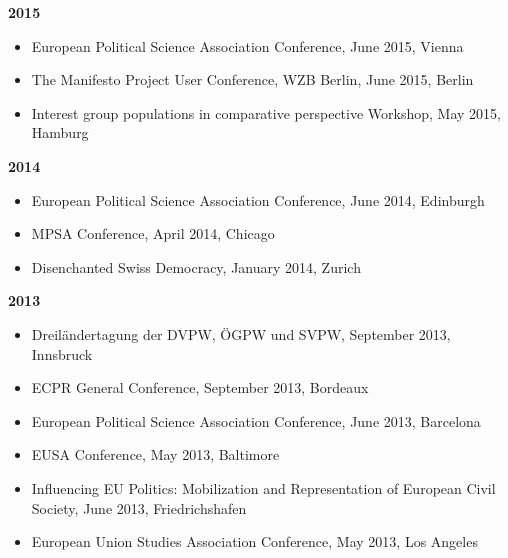 \vspace{\baselineskip}

\textbf{2015}
\begin{itemize}[topsep=0pt, noitemsep, leftmargin=3]
	\item European Political Science Association Conference, June 2015, Vienna
	\item The Manifesto Project User Conference, WZB Berlin, June 2015, Berlin
	\item Interest group populations in comparative perspective Workshop, May 2015, Hamburg
\end{itemize}

\vspace{\baselineskip}

\textbf{2014}
\begin{itemize}[topsep=0pt, noitemsep, leftmargin=3]
	\item European Political Science Association Conference, June 2014, Edinburgh
	\item MPSA Conference, April 2014, Chicago
	\item Disenchanted Swiss Democracy, January 2014, Zurich
\end{itemize}

\vspace{\baselineskip}

\textbf{2013}
\begin{itemize}[topsep=0pt, noitemsep, leftmargin=3]
	\item Dreiländertagung der DVPW, ÖGPW und SVPW, September 2013, Innsbruck
	\item ECPR General Conference, September 2013, Bordeaux
	\item European Political Science Association Conference, June 2013, Barcelona
	\item  EUSA Conference, May 2013, Baltimore
	\item Influencing EU Politics: Mobilization and Representation of European Civil Society, June 2013, Friedrichshafen
	\item European Union Studies Association Conference, May 2013, Los Angeles
\end{itemize}

\vspace{\baselineskip}

